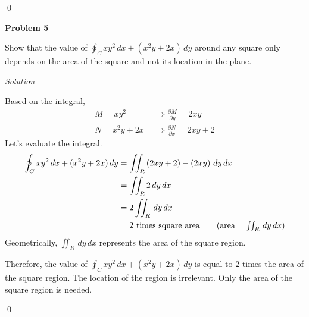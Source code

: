 \documentclass{article}
\newcommand{\lrp}[1]{\left( #1 \right)}
\newcommand{\Solution}{\textit{Solution}}
\begin{document}
\qed

{}\textbf{Problem 5}

Show that the value of $\displaystyle \oint_C xy^2\,dx+(x^2y+2x)\,dy$ around any square only depends on the area of the square and not its location in the plane.

\Solution

Based on the integral,
\begin{align*}
    M=xy^2&\implies \frac{\partial M}{\partial y}=2xy\\
    N=x^2y+2x&\implies \frac{\partial N}{\partial x}=2xy+2
\end{align*}
Let's evaluate the integral.
\begin{align*}
    \oint_C xy^2\,dx+(x^2y+2x)\,dy&=\iint_R \lrp{2xy+2}-\lrp{2xy}\,dy\,dx\\
    &=\iint_R 2\,dy\,dx\\
    &=2\iint_R \,dy\,dx\\
    &=2\text{ times square area}\tag{$\text{area}=\iint_R \,dy\,dx$}
\end{align*}
Geometrically, $\displaystyle \iint_R \,dy\,dx$ represents the area of the square region. 

Therefore, the value of $\displaystyle \oint_C xy^2\,dx+(x^2y+2x)\,dy$ is equal to $2$ times the area of the square region. The location of the region is irrelevant. Only the area of the square region is needed.

\qed
\end{document}
